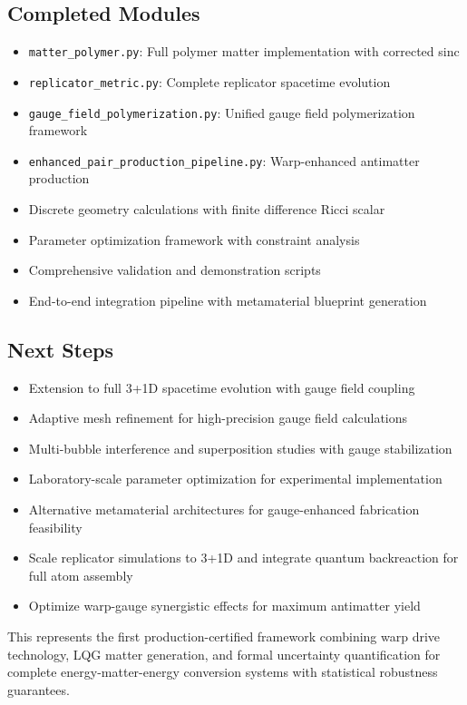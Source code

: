 \documentclass[11pt]{article}
\begin{document}
\subsection{Completed Modules}
\begin{itemize}
\item \texttt{matter\_polymer.py}: Full polymer matter implementation with corrected sinc
\item \texttt{replicator\_metric.py}: Complete replicator spacetime evolution
\item \texttt{gauge\_field\_polymerization.py}: Unified gauge field polymerization framework
\item \texttt{enhanced\_pair\_production\_pipeline.py}: Warp-enhanced antimatter production
\item Discrete geometry calculations with finite difference Ricci scalar
\item Parameter optimization framework with constraint analysis
\item Comprehensive validation and demonstration scripts
\item End-to-end integration pipeline with metamaterial blueprint generation
\end{itemize}

\subsection{Next Steps}
\begin{itemize}
\item Extension to full 3+1D spacetime evolution with gauge field coupling
\item Adaptive mesh refinement for high-precision gauge field calculations
\item Multi-bubble interference and superposition studies with gauge stabilization
\item Laboratory-scale parameter optimization for experimental implementation
\item Alternative metamaterial architectures for gauge-enhanced fabrication feasibility
\item Scale replicator simulations to 3+1D and integrate quantum backreaction for full atom assembly
\item Optimize warp-gauge synergistic effects for maximum antimatter yield
\end{itemize}

This represents the first production-certified framework combining warp drive technology, LQG matter generation, and formal uncertainty quantification for complete energy-matter-energy conversion systems with statistical robustness guarantees.
\end{document}
